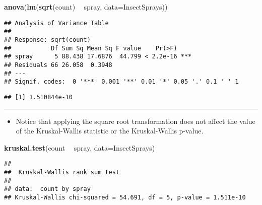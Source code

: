 \documentclass[]{book}
\newenvironment{Shaded}{\begin{snugshade}}{\end{snugshade}}
\newcommand{\DataTypeTok}[1]{\textcolor[rgb]{0.13,0.29,0.53}{#1}}
\newcommand{\KeywordTok}[1]{\textcolor[rgb]{0.13,0.29,0.53}{\textbf{#1}}}
\newcommand{\NormalTok}[1]{#1}
\newcommand{\OperatorTok}[1]{\textcolor[rgb]{0.81,0.36,0.00}{\textbf{#1}}}
\newcommand{\StringTok}[1]{\textcolor[rgb]{0.31,0.60,0.02}{#1}}
\providecommand{\tightlist}{%
  \setlength{\itemsep}{0pt}\setlength{\parskip}{0pt}}
\begin{document}
\begin{Shaded}
\begin{Highlighting}[]
\KeywordTok{anova}\NormalTok{(}\KeywordTok{lm}\NormalTok{(}\KeywordTok{sqrt}\NormalTok{(count) }\OperatorTok{~}\StringTok{ }\NormalTok{spray, }\DataTypeTok{data=}\NormalTok{InsectSprays))}
\end{Highlighting}
\end{Shaded}

\begin{verbatim}
## Analysis of Variance Table
## 
## Response: sqrt(count)
##           Df Sum Sq Mean Sq F value    Pr(>F)    
## spray      5 88.438 17.6876  44.799 < 2.2e-16 ***
## Residuals 66 26.058  0.3948                      
## ---
## Signif. codes:  0 '***' 0.001 '**' 0.01 '*' 0.05 '.' 0.1 ' ' 1
\end{verbatim}

\begin{Shaded}
\end{Shaded}

\begin{verbatim}
## [1] 1.510844e-10
\end{verbatim}

\begin{center}\rule{0.5\linewidth}{\linethickness}\end{center}

\begin{itemize}
\tightlist
\item
  Notice that applying the square root transformation does not affect the
  value of the Kruskal-Wallis statistic or the Kruskal-Wallis p-value.
\end{itemize}

\begin{Shaded}
\begin{Highlighting}[]
\KeywordTok{kruskal.test}\NormalTok{(count }\OperatorTok{~}\StringTok{ }\NormalTok{spray, }\DataTypeTok{data=}\NormalTok{InsectSprays)}
\end{Highlighting}
\end{Shaded}

\begin{verbatim}
## 
##  Kruskal-Wallis rank sum test
## 
## data:  count by spray
## Kruskal-Wallis chi-squared = 54.691, df = 5, p-value = 1.511e-10
\end{verbatim}
\end{document}

